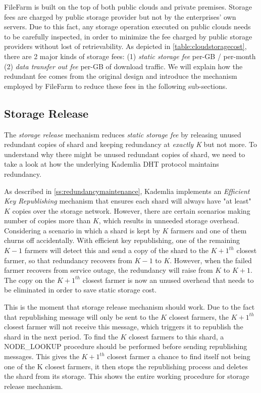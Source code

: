 FileFarm is built on the top of both public clouds and private premises. Storage fees are charged by public storage provider but not by the enterprises' own servers. Due to this fact, any storage operation executed on public clouds needs to be carefully inspected, in order to minimize the fee charged by public storage providers without lost of retrievability. As depicted in \ref{table:cloudstoragecost}, there are 2 major kinds of storage fees: (1) \textit{static storage fee} per-GB / per-month (2) \textit{data transfer out fee} per-GB of download traffic. We will explain how the redundant fee comes from the original design and introduce the mechanism employed by FileFarm to reduce these fees in the following sub-sections.

\subsection{Storage Release}
\label{ss:storagerelease}

The \textit{storage release} mechanism reduces \textit{static storage fee} by releasing unused redundant copies of shard and keeping redundancy at \textit{exactly K} but not more. To understand why there might be unused redundant copies of shard, we need to take a look at how the underlying Kademlia DHT protocol maintains redundancy.

As described in \ref{ss:redundancymaintenance}, Kademlia implements an \textit{Efficient Key Republishing} mechanism that ensures each shard will always have "at least" $K$ copies over the storage network. However, there are certain scenarios making number of copies more than $K$, which results in unneeded storage overhead. Considering a scenario in which a shard is kept by $K$ farmers and one of them churns off accidentally. With efficient key republishing, one of the remaining $K-1$
farmers will detect this and send a copy of the shard to the $K+1^{th}$ closest farmer, so that redundancy recovers from $K-1$ to $K$. However, when the failed farmer recovers from service outage, the redundancy will raise from $K$ to $K+1$. The copy on the $K+1^{th}$ closest farmer is now an unused overhead that needs to be eliminated in order to save static storage cost.

This is the moment that storage release mechanism should work. Due to the fact that republishing message will only be sent to the $K$ closest farmers, the $K+1^{th}$ closest farmer will not receive this message, which triggers it to republish the shard in the next period. To find the $K$ closest farmers to this shard, a NODE\_LOOKUP procedure should be performed before sending republishing messages. This gives the $K+1^{th}$ closest farmer a chance to find itself not being one of the K closest farmers, it then stops the republishing process and deletes the shard from its storage. This shows the entire working procedure for storage release mechanism.

